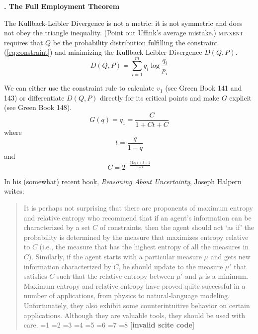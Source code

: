 \documentclass[11pt]{article}
\newcommand{\kapt}[1]{\textbf{{\thechap}. #1}\addtocounter{chap}{1}}
\newcommand{\qnull}[1]{`#1'}
\newif\ifNumericalOrYear
\newcommand{\PageP}{p.~}
\newcommand{\PageP}{}
\newcommand{\scite}[3]{\ifnum#1=1\ifNumericalOrYear\citep{#2}\else\citeyearpar{#2}\fi\else
\ifnum#1=2\ifNumericalOrYear\citep[#3]{#2}\else\citep[{\PageP}#3]{#2}\fi\else
\ifnum#1=3\ifNumericalOrYear(\citet[#3]{#2})\else\citep[{\PageP}#3]{#2}\fi\else
\ifnum#1=4\ifNumericalOrYear\citet{#2}\else\citet{#2}\fi\else
\ifnum#1=5\ifNumericalOrYear(\citet{#2})\else\citep{#2}\fi\else
\ifnum#1=6\ifNumericalOrYear(\citet[#3]{#2})\else\citep[{\PageP}#3]{#2}\fi\else
\ifnum#1=7\ifNumericalOrYear\citep{#2}\else\citealp{#2}\fi\else
\ifnum#1=8\ifNumericalOrYear\citep[#3]{#2}\else\citealp[{\PageP}#3]{#2}\fi\else
\textbf{[invalid scite code]}\fi\fi\fi\fi\fi\fi\fi\fi}
\newenvironment{quotex}{\begin{quote}\begin{footnotesize}}{\end{footnotesize}\end{quote}}
\begin{document}
\kapt{The Full Employment Theorem}

The Kullback-Leibler Divergence is not a metric: it is not symmetric
and does not obey the triangle inequality. (Point out Uffink's average
mistake.) \textsc{minxent} requires that $Q$ be the probability
distribution fulfilling the constraint ({\ref{eq:constraint}}) and
minimizing the Kullback-Leibler Divergence $D(Q,P)$. 
\begin{equation}
  \label{eq:kl}
  D(Q,P)=\sum_{i=1}^{m}q_{i}\log\frac{q_{i}}{p_{i}}
\end{equation}

We can either use the constraint rule to calculate $v_{1}$ (see Green
Book 141 and 143) or differentiate $D(Q,P)$ directly for its critical
points and make $G$ explicit (see Green Book 148).
\begin{equation}
  \label{eq:fromq1toq}
  G(q)=q_{1}=\frac{C}{1+Ct+C}
\end{equation}
where
\begin{equation*}
  t=\frac{q}{1-q}
\end{equation*}
and
\begin{equation*}
  C=2^{-\frac{t\log{}t+t+1}{1+t}}
\end{equation*}

In his (somewhat) recent book, \emph{Reasoning About Uncertainty},
Joseph Halpern writes:
\begin{quotex}
  It is perhaps not surprising that there are proponents of maximum
  entropy and relative entropy who recommend that if an agent's
  information can be characterized by a set $C$ of constraints, then
  the agent should act \qnull{as if} the probability is determined by
  the measure that maximizes entropy relative to $C$ (i.e., the
  measure that has the highest entropy of all the measures in $C$).
  Similarly, if the agent starts with a particular measure $\mu$ and
  gets new information characterized by $C$, he should update to the
  measure $\mu'$ that satisfies $C$ such that the relative entropy
  between $\mu'$ and $\mu$ is a minimum. Maximum entropy and relative
  entropy have proved quite successful in a number of applications,
  from physics to natural-language modeling. Unfortunately, they also
  exhibit some counterintuitive behavior on certain applications.
  Although they are valuable tools, they should be used with care.
  \scite{3}{halpern03}{110}
\end{quotex}
\end{document}

